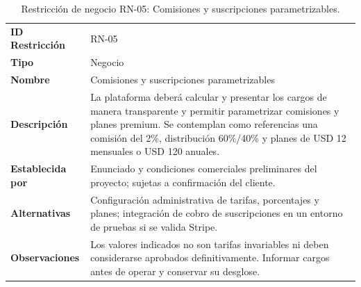 \documentclass[11pt,a4paper,oneside]{article}
\begin{document}
\begingroup
\small
\setlength{\tabcolsep}{7pt}
\renewcommand{\arraystretch}{1.30}
\setlength{\anchoRegistro}{\dimexpr\textwidth-4\tabcolsep-3\arrayrulewidth\relax}
\begin{table}[H]
\centering
\caption{Restricción de negocio RN-05: Comisiones y suscripciones parametrizables.}
\label{tab:restriccion-rn-05}
\begin{tabular}{|
>{\RaggedRight\arraybackslash}p{.28\anchoRegistro}|
>{\RaggedRight\arraybackslash}p{.72\anchoRegistro}|}
\hline
\rowcolor{negroTabla}
\multicolumn{2}{|l|}{\color{white}\bfseries Registro de Restricción de Negocio}\\\hline
\cellcolor{azulTabla}\bfseries ID Restricción
& RN-05\\\hline
\cellcolor{azulTabla}\bfseries Tipo
& Negocio\\\hline
\cellcolor{azulTabla}\bfseries Nombre
& Comisiones y suscripciones parametrizables\\\hline
\cellcolor{azulTabla}\bfseries Descripción
& La plataforma deberá calcular y presentar los cargos de manera transparente y permitir parametrizar comisiones y planes premium. Se contemplan como referencias una comisión del 2\%, distribución 60\%/40\% y planes de USD 12 mensuales o USD 120 anuales.\\\hline
\cellcolor{azulTabla}\bfseries Establecida por
& Enunciado y condiciones comerciales preliminares del proyecto; sujetas a confirmación del cliente.\\\hline
\cellcolor{azulTabla}\bfseries Alternativas
& Configuración administrativa de tarifas, porcentajes y planes; integración de cobro de suscripciones en un entorno de pruebas si se valida Stripe.\\\hline
\cellcolor{azulTabla}\bfseries Observaciones
& Los valores indicados no son tarifas invariables ni deben considerarse aprobados definitivamente. Informar cargos antes de operar y conservar su desglose.\\\hline
\end{tabular}
\end{table}
\endgroup
\end{document}
